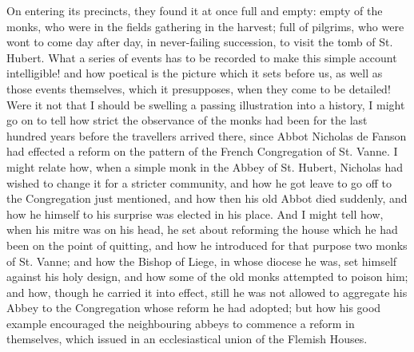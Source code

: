 On entering its precincts, they found it at once full and empty:
empty of the monks, who were in the fields gathering in the harvest;
full of pilgrims, who were wont to come day after day, in
never-failing succession, to visit the tomb of St. Hubert. What a
series of events has to be recorded to make this simple account
intelligible! and how poetical is the picture which it sets before us,
as well as those events themselves, which it presupposes, when they
come to be detailed! Were it not that I should be swelling a passing
illustration into a history, I might go on to tell how strict the
observance of the monks had been for the last hundred years before the
travellers arrived there, since Abbot Nicholas de Fanson had effected
a reform on the pattern of the French Congregation of St. Vanne. I
might relate how, when a simple monk in the Abbey of St. Hubert,
Nicholas had wished to change it for a stricter community, and how he
got leave to go off to the Congregation just mentioned, and how then
his old Abbot died suddenly, and how he himself to his surprise was
elected in his place. And I might tell how, when his mitre was on his
head, he set about reforming the house which he had been on the point
of quitting, and how he introduced for that purpose two monks of St.
Vanne; and how the Bishop of Liege, in whose diocese he was, set
himself against his holy design, and how some of the old monks
attempted to poison him; and how, though he carried it into effect,
still he was not allowed to aggregate his Abbey to the Congregation
whose reform he had adopted; but how his good example encouraged the
neighbouring abbeys to commence a reform in themselves, which issued
in an ecclesiastical union of the Flemish Houses.

